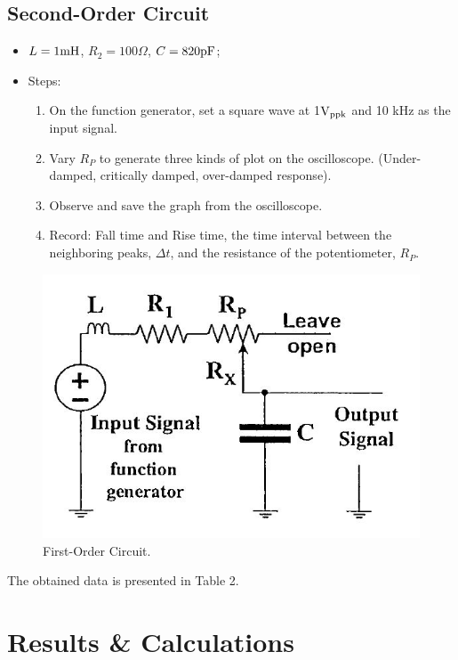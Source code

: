 \documentclass[a4paper]{report}
\begin{document}
	\subsection{Second-Order Circuit}
	\begin{itemize}
		\item $L=1\rm{mH}$, $R_2=100\Omega$, $C=820\rm{pF}$;
		\item Steps:
		\begin{enumerate}[1.]
			\item On the function generator, set a square wave at 1$\rm{V_{ppk}}$ and 10 kHz as the input signal.
			\item Vary $R_P$ to generate three kinds of plot on the oscilloscope. (Under-damped, critically damped, over-damped response).
			\item Observe and save the graph from the oscilloscope.
			\item Record: Fall time and Rise time, the time interval between the neighboring peaks, $\Delta t$, and the resistance of the potentiometer, $R_P$.
		\end{enumerate}
	\end{itemize}
	\begin{figure}[H]
		\centering
		\includegraphics[width=0.8\linewidth]{2.jpg}
		\caption{First-Order Circuit.}
	\end{figure}
	The obtained data is presented in Table 2.
	\section{Results \& Calculations}
\end{document}
